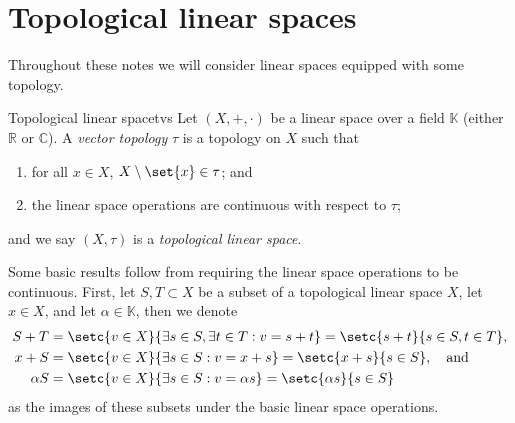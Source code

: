\section{Topological linear spaces}
Throughout these notes we will consider linear spaces equipped with some topology.
\begin{definition}{Topological linear space}{tvs}
    Let \((X, +, \cdot)\) be a linear space over a field \(\mathbb{K}\) (either \(\mathbb{R}\) or \(\mathbb{C}\)). A \emph{vector topology} \(\tau\) is a topology on \(X\) such that
    \begin{enumerate}[label=(\alph*)]
        \item for all \(x \in X\), \(X \setminus \set{x} \in \tau\); and
        \item the linear space operations are continuous with respect to \(\tau\);
    \end{enumerate}
    and we say \((X, \tau)\) is a \emph{topological linear space}.
\end{definition}

Some basic results follow from requiring the linear space operations to be continuous. First, let \(S,T \subset X\) be a subset of a topological linear space \(X\), let \(x \in X\), and let \(\alpha \in \mathbb{K}\), then we denote
\begin{align*}
    S + T &= \setc{v \in X}{\exists s \in S, \exists t \in T : v = s + t} = \setc{s + t}{s \in S, t \in T},\\
    x + S &= \setc{v \in X}{\exists s \in S : v = x + s} = \setc{x + s}{s \in S},\quad\text{and}\\
    \alpha S &= \setc{v \in X}{\exists s \in S : v = \alpha s} = \setc{\alpha s}{s \in S}
\end{align*}
as the images of these subsets under the basic linear space operations.

